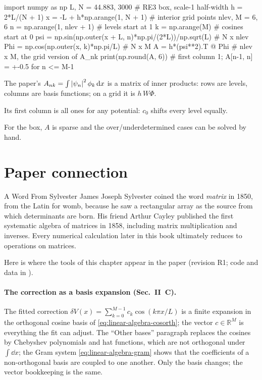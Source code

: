 \begin{pycode}
import numpy as np
L, N = 44.883, 3000                 # RE3 box, scale-1 half-width
h = 2*L/(N + 1)
x = -L + h*np.arange(1, N + 1)      # interior grid points
nlev, M = 6, 6
n = np.arange(1, nlev + 1)          # levels start at 1
k = np.arange(M)                    # cosines start at 0
psi = np.sin(np.outer(x + L, n)*np.pi/(2*L))/np.sqrt(L)   # N x nlev
Phi = np.cos(np.outer(x, k)*np.pi/L)                       # N x M
A = h*(psi**2).T @ Phi              # nlev x M, the grid version of A_nk
print(np.round(A, 6))               # first column 1; A[n-1, n] = +-0.5 for n <= M-1
\end{pycode}

\begin{keyideas}
\item The paper's $A_{nk}=\int\left\lvert \psi_n\right\rvert^2\phi_k\,\mathrm{d} x$ is a matrix of inner products: rows are levels, columns are basis functions; on a grid it is $h\,W\Phi$.
\item Its first column is all ones for any potential: $c_0$ shifts every level equally.
\item For the box, $A$ is sparse and the over/underdetermined cases can be solved by hand.
\end{keyideas}

\section{Paper connection}\label{sec:linear-algebra-paper}
\begin{didyouknow}{A Word From Sylvester}
James Joseph Sylvester coined the word \emph{matrix} in 1850, from the Latin for womb, because he saw a rectangular array as the source from which determinants are born. His friend Arthur Cayley published the first systematic algebra of matrices in 1858, including matrix multiplication and inverses. Every numerical calculation later in this book ultimately reduces to operations on matrices.
\end{didyouknow}

Here is where the tools of this chapter appear in the paper \cite{soniR1} (revision R1; code and data in \cite{zenodo}).

\paragraph{The correction as a basis expansion (Sec.~II~C).} The fitted correction $\delta V(x)=\sum_{k=0}^{M-1}c_k\cos(k\pi x/L)$ is a finite expansion in the orthogonal cosine basis of \cref{eq:linear-algebra-cosorth}; the vector $c\in\mathbb R^M$ is everything the fit can adjust. The ``Other bases'' paragraph replaces the cosines by Chebyshev polynomials and hat functions, which are not orthogonal under $\int\dd x$; the Gram system \cref{eq:linear-algebra-gram} shows that the coefficients of a non-orthogonal basis are coupled to one another. Only the basis changes; the vector bookkeeping is the same.


